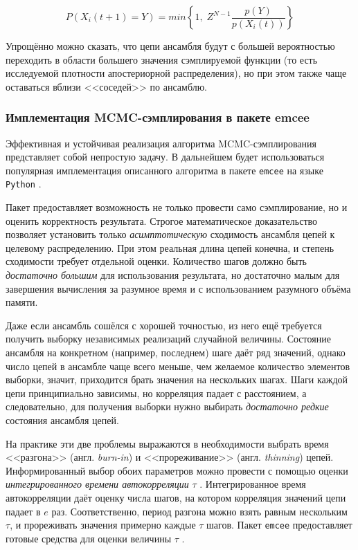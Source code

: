 \begin{equation}
	P(X_i(t + 1) = Y) = min \left\{ 1, \; Z^{N - 1} \frac{p(Y)}{p(X_i(t))} \right\}
\end{equation}

Упрощённо можно сказать, что цепи ансамбля будут с большей вероятностью переходить в области большего значения сэмплируемой функции (то есть исследуемой плотности апостериорной распределения), но при этом также чаще оставаться вблизи <<соседей>> по ансамблю.

\subsubsection{Имплементация MCMC-сэмплирования в пакете emcee}

\label{sec:mcmc-implementation-details}

Эффективная и устойчивая реализация алгоритма MCMC-сэмплирования представляет собой непростую задачу. В дальнейшем будет использоваться популярная имплементация описанного алгоритма в пакете \verb|emcee| на языке \verb|Python| \cite{ForemanMackey2016}.

Пакет предоставляет возможность не только провести само сэмплирование, но и оценить корректность результата. Строгое математическое доказательство позволяет установить только \textit{асимптотическую} сходимость ансамбля цепей к целевому распределению. При этом реальная длина цепей конечна, и степень сходимости требует отдельной оценки. Количество шагов должно быть \textit{достаточно большим} для использования результата, но достаточно малым для завершения вычисления за разумное время и с использованием разумного объёма памяти.

Даже если ансамбль сошёлся с хорошей точностью, из него ещё требуется получить выборку независимых реализаций случайной величины. Состояние ансамбля на конкретном (например, последнем) шаге даёт ряд значений, однако число цепей в ансамбле чаще всего меньше, чем желаемое количество элементов выборки, значит, приходится брать значения на нескольких шагах. Шаги каждой цепи принципиально зависимы, но корреляция падает с расстоянием, а следовательно, для получения выборки нужно выбирать \textit{достаточно редкие} состояния ансамбля цепей.

На практике эти две проблемы выражаются в необходимости выбрать время <<разгона>> (англ. \textit{burn-in}) и <<прореживание>> (англ. \textit{thinning}) цепей. Информированный выбор обоих параметров можно провести с помощью оценки \textit{интегрированного времени автокорреляции} $\tau$ \cite{Sokal1997}. Интегрированное время автокорреляции даёт оценку числа шагов, на котором корреляция значений цепи падает в $e$ раз. Соответственно, период разгона можно взять равным нескольким $\tau$, и прореживать значения примерно каждые $\tau$ шагов. Пакет \verb|emcee| предоставляет готовые средства для оценки величины $\tau$ .

